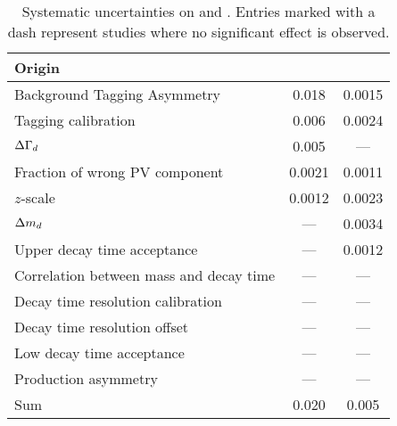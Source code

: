 \begin{table}[htb]
  \caption{Systematic uncertainties on \SJpsiKS and \CJpsiKS. Entries marked
  with a dash represent studies where no significant effect is observed.}
  \label{tab:bd2jpsiks:systematics}
  \centering
    \begin{tabular}{lSS}
      \toprule
      Origin & {\param{\sigma}{}{$\SJpsiKS$}} & {\param{\sigma}{}{$\CJpsiKS$}} \\
      \midrule
      Background Tagging Asymmetry            &  0.018  &  0.0015 \\
      Tagging calibration                     &  0.006  &  0.0024 \\
      ${\Delta\Gamma_{{d}}}$                                  &  0.005  &  {---} \\
      Fraction of wrong PV component          &  0.0021 &  0.0011 \\
      $z$-scale                               &  0.0012 &  0.0023 \\
      ${\Delta m_{{d}}}$                                  &  {---}  &  0.0034 \\
      Upper decay time acceptance             &  {---}  &  0.0012 \\
      Correlation between mass and decay time &  {---}  &  {---} \\
      Decay time resolution calibration       &  {---}  &  {---} \\
      Decay time resolution offset            &  {---}  &  {---} \\
      Low decay time acceptance               &  {---}  &  {---} \\
      Production asymmetry                    &  {---}  &  {---} \\
      \midrule
      Sum                                     &  0.020  &  0.005 \\
      \bottomrule
    \end{tabular}
\end{table}
